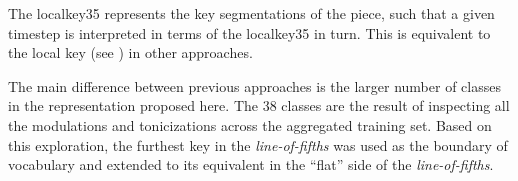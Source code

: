 
The \gls{localkey35} represents the key segmentations of the
piece, such that a given timestep is interpreted in terms of
the \gls{localkey35} in turn. This is equivalent to the
local key (see ) in other approaches.

The main difference between previous approaches is the
larger number of classes in the representation proposed
here. The 38 classes are the result of inspecting all the
modulations and tonicizations across the aggregated training
set. Based on this exploration, the furthest key in the
\emph{line-of-fifths} \parencite{temperley2000line} was used
as the boundary of vocabulary and extended to its equivalent
in the ``flat'' side of the \emph{line-of-fifths}.

